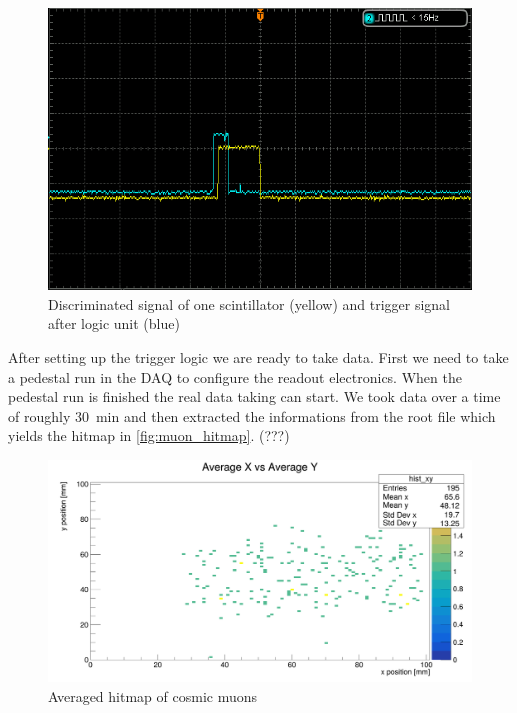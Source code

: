 \documentclass[sn-mathphys-num,iicol]{sn-jnl}
\theoremstyle{thmstyleone}
\theoremstyle{thmstyletwo}
\theoremstyle{thmstylethree}
\begin{document}
\begin{figure}
  \includegraphics[width=\linewidth]{figures/DS1Z_QuickPrint2_cropped.png}
  \caption{Discriminated signal of one scintillator (yellow) and trigger signal after logic unit (blue)}
  \label{fig:disc_signal}
\end{figure}

After setting up the trigger logic we are ready to take data. First we need to take a pedestal run in the DAQ to configure the readout electronics.
When the pedestal run is finished the real data taking can start. 
We took data over a time of roughly \SI{30}{\minute} and then extracted the informations from the root file which yields the hitmap in \autoref{fig:muon_hitmap}. (???) %

\begin{figure}
  \includegraphics[width=\linewidth]{../src/elsa/finished_plots/muon_hitmap_avg.png}
  \caption{Averaged hitmap of cosmic muons}
  \label{fig:muon_hitmap}
\end{figure}
\end{document}
